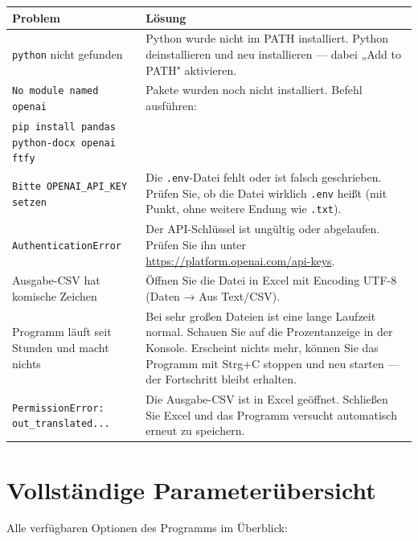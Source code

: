 \documentclass[a4paper,11pt]{article}
\begin{document}
\begin{center}
\begin{tabularx}{0.96\textwidth}{@{}p{4cm} X@{}}
\toprule
\textbf{Problem} & \textbf{Lösung} \\
\midrule
\texttt{python} nicht gefunden &
  Python wurde nicht im PATH installiert. Python deinstallieren und neu
  installieren — dabei „Add to PATH" aktivieren. \\[6pt]

\texttt{No module named openai} &
  Pakete wurden noch nicht installiert. Befehl ausführen:\\
  \texttt{pip install pandas python-docx openai ftfy} \\[6pt]

\texttt{Bitte OPENAI\_API\_KEY setzen} &
  Die \texttt{.env}-Datei fehlt oder ist falsch geschrieben.
  Prüfen Sie, ob die Datei wirklich \texttt{.env} heißt (mit Punkt,
  ohne weitere Endung wie \texttt{.txt}). \\[6pt]

\texttt{AuthenticationError} &
  Der API-Schlüssel ist ungültig oder abgelaufen. Prüfen Sie ihn unter
  \url{https://platform.openai.com/api-keys}. \\[6pt]

Ausgabe-CSV hat komische Zeichen &
  Öffnen Sie die Datei in Excel mit Encoding UTF-8 (Daten → Aus Text/CSV). \\[6pt]

Programm läuft seit Stunden und macht nichts &
  Bei sehr großen Dateien ist eine lange Laufzeit normal. Schauen Sie auf die
  Prozentanzeige in der Konsole. Erscheint nichts mehr, können Sie das Programm
  mit Strg+C stoppen und neu starten — der Fortschritt bleibt erhalten. \\[6pt]

\texttt{PermissionError: out\_translated...} &
  Die Ausgabe-CSV ist in Excel geöffnet. Schließen Sie Excel und das Programm
  versucht automatisch erneut zu speichern. \\
\bottomrule
\end{tabularx}
\end{center}

\section{Vollständige Parameterübersicht}

Alle verfügbaren Optionen des Programms im Überblick:
\end{document}

